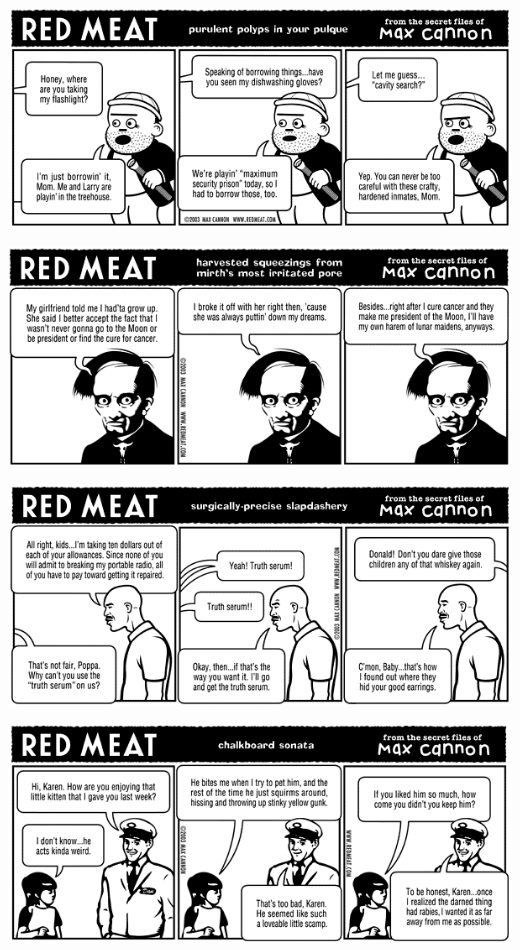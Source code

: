 \documentclass[a4paper,twoside,11pt]{article}
\begin{document}
\includegraphics[width=\textwidth]{redmeat_2003-09-30.png}



\includegraphics[width=\textwidth]{redmeat_2003-10-07.png}



\includegraphics[width=\textwidth]{redmeat_2003-10-14.png}



\includegraphics[width=\textwidth]{redmeat_2003-10-21.png}
\end{document}
